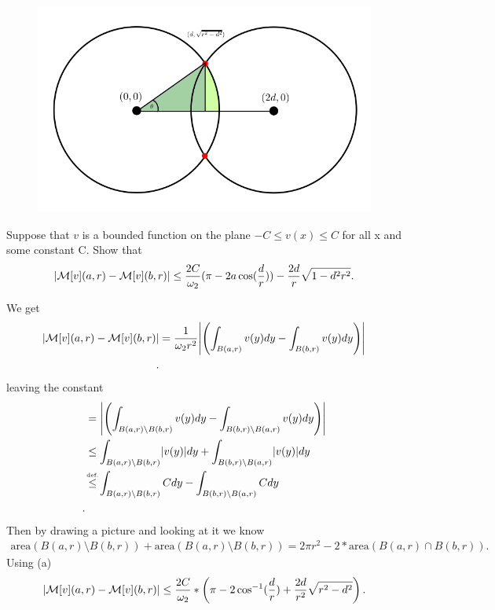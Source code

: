 \begin{solution}
\begin{center}
\begin{figure}[H]
      \includegraphics[scale=1]{figures/area_alternative.png}
   \end{figure} 
  \end{center}
\end{solution}
\newpage
\begin{exercise}[b]
 Suppose that $v$ is a bounded function on the plane $-C \le v(x) \le C$  for all x and some constant C. Show that 
 \begin{align*}
   \lvert\mathcal{M}[v](a,r) - \mathcal{M}[v](b,r)\rvert \le \frac{2C}{\omega_2}(\pi -2a\cos(\frac{d}{r})) - \frac{2d}{r}\sqrt{1-d^2r^2} 
 .\end{align*}
\end{exercise}
\begin{solution}
  We get
  \begin{align*}
    \abs{\mathcal{M}[v](a,r) - \mathcal{M}[v](b,r)} &=\frac{1}{\omega_2r^{2} }  \abs*{\left(  \int_{B(a,r)} v(y) dy -  \int_{B(b,r)} v(y) dy \right)} \\
  .\end{align*}
  leaving the constant 
\begin{align*} 
  &=\abs*{\left(  \int_{B(a,r) \setminus B(b,r)} v(y) dy -  \int_{B(b,r) \setminus B(a,r)} v(y) dy \right)} \\
  &\le   \int_{B(a,r) \setminus B(b,r)} \abs*{v(y)} dy +  \int_{B(b,r) \setminus B(a,r)} \abs{v(y)} dy \\
  &\myS{def.}{\le } \int_{B(a,r) \setminus B(b,r)} C dy -  \int_{B(b,r) \setminus B(a,r)} C dy \\
.\end{align*}
Then by drawing a picture and looking at it we know 
\begin{align*}
  \text{area}(B(a,r) \setminus B(b,r)) + \text{area}(B(a,r) \setminus B(b,r)) =  2\pi r^2 - 2*\text{area}(B(a,r) \cap B(b,r))
.\end{align*}
Using (a)
\begin{align*}
  \lvert\mathcal{M}[v](a,r) - \mathcal{M}[v](b,r)\rvert \le \frac{2C}{\omega_2}*\left(\pi - 2\cos^{-1}(\frac{d}{r})+\frac{2d}{r^2}\sqrt{r^2-d^2}  \right) 
.\end{align*}
\end{solution}
